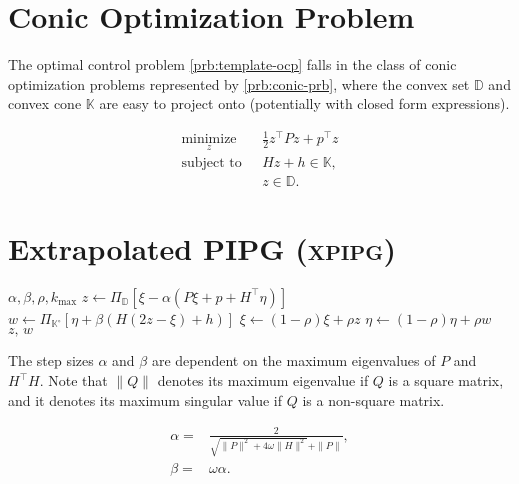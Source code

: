 \documentclass[letterpaper,11pt]{article}
\newcommand{\xpipg}{\textsc{\relsize{-1}x\relsize{1}pipg}}
\begin{document}
\section{Conic Optimization Problem}

The optimal control problem \eqref{prb:template-ocp} falls in the class of conic optimization problems represented by \eqref{prb:conic-prb}, where the convex set $\mathbb{D}$ and convex cone $\mathbb{K}$ are easy to project onto (potentially with closed form expressions).

\begin{subequations}
\begin{align*}
\underset{z}{\operatorname{minimize}}~~~&~\frac{1}{2}z^\top P  z + p^\top z\\
    \operatorname{subject~to}~~&~Hz + h \in \mathbb{K},\\
    &~z\in\mathbb{D}.    
\end{align*}\label{prb:conic-prb}    
\end{subequations}

\section{Extrapolated PIPG (\xpipg)}

\begin{algorithm}[!htpb]
\caption{Vectorized \xpipg}
\label{alg:xpipg-vec}
\begin{algorithmic}[1]
    \Require $\alpha,\beta,\rho,k_{\max}$
        \State $z \gets \Pi_{\mathbb{D}}\left[ \xi - \alpha (P\xi + p + H^\top\eta) \right]$
        \State $w \gets \Pi_{\mathbb{K}^\circ}\left[ \eta + \beta ( H (2z-\xi) + h ) \right]$
        \State $\xi \gets (1-\rho)\xi + \rho z$
        \State $\eta \gets (1-\rho)\eta + \rho w$
    \EndFor
    \Ensure $z,\,w$
\end{algorithmic}
\end{algorithm}

The step sizes $\alpha$ and $\beta$ are dependent on the maximum eigenvalues of $P$ and $H^\top H$. Note that $\|Q\|$ denotes its maximum eigenvalue if $Q$ is a square matrix, and it denotes its maximum singular value if $Q$ is a non-square matrix.

\begin{subequations}
\begin{align}
    \alpha ={} & \frac{2}{\sqrt{\|P\|^2 + 4\omega\|H\|^2}  + \|P\|},\\
    \beta ={} & \omega\alpha.
\end{align}    
\end{subequations}
\end{document}
